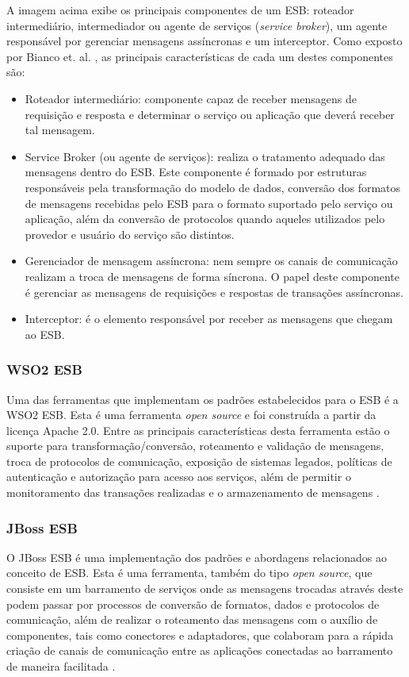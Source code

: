 A imagem acima exibe os principais componentes de um ESB: roteador intermediário, intermediador ou agente de serviços (\textit{service broker}), um agente responsável por gerenciar mensagens assíncronas e um interceptor. Como exposto por Bianco et. al. \cite{bianco_architecting_2011}, as principais características de cada um destes componentes são:

\begin{itemize}
\item Roteador intermediário: componente capaz de receber mensagens de requisição e resposta e determinar o serviço ou aplicação que deverá receber tal mensagem.
\item Service Broker (ou agente de serviços): realiza o tratamento adequado das mensagens dentro do ESB. Este componente é formado por estruturas responsáveis pela transformação do modelo de dados, conversão dos formatos de mensagens recebidas pelo ESB para o formato suportado pelo serviço ou aplicação, além da conversão de protocolos quando aqueles utilizados pelo provedor e usuário do serviço são distintos.
\item Gerenciador de mensagem assíncrona: nem sempre os canais de comunicação realizam a troca de mensagens de forma síncrona. O papel deste componente é gerenciar as mensagens de requisições e respostas de transações assíncronas.
\item Interceptor: é o elemento responsável por receber as mensagens que chegam ao ESB.
\end{itemize}

\subsubsection{WSO2 ESB}
Uma das ferramentas que implementam os padrões estabelecidos para o ESB é a WSO2 ESB. Esta é uma ferramenta \textit{open source} e foi construída a partir da licença Apache 2.0. Entre as principais características desta ferramenta estão o suporte para transformação/conversão, roteamento e validação de mensagens, troca de protocolos de comunicação, exposição de sistemas legados, políticas de autenticação e autorização para acesso aos serviços, além de permitir o monitoramento das transações realizadas e o armazenamento de mensagens \cite{siriwardena_enterprise_2013}.

\subsubsection{JBoss ESB}
O JBoss ESB é uma implementação dos padrões e abordagens relacionados ao conceito de ESB. Esta é uma ferramenta, também do tipo \textit{open source}, que consiste em um barramento de serviços onde as mensagens trocadas através deste podem passar por processos de conversão de formatos, dados e protocolos de comunicação, além de realizar o roteamento das mensagens com o auxílio de componentes, tais como conectores e adaptadores, que colaboram para a rápida criação de canais de comunicação entre as aplicações conectadas ao barramento de maneira facilitada \cite{silva_jbossesb_2008}.

